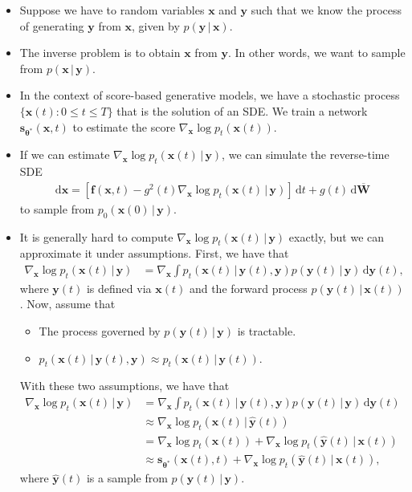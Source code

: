 \documentclass[10pt]{article}
\newcommand{\dee}{\mathrm{d}}
\newcommand{\ve}[1]{\mathbf{#1}}
\newcommand{\ves}[1]{\boldsymbol{#1}}
\begin{document}
\begin{itemize}
  \item Suppose we have to random variables $\ve{x}$ and $\ve{y}$ such that we know the process of generating $\ve{y}$ from $\ve{x}$, given by $p(\ve{y}\,|\, \ve{x})$.
  
  \item The inverse problem is to obtain $\ve{x}$ from $\ve{y}$. In other words, we want to sample from $p(\ve{x}\,|\,\ve{y})$.
  
  \item In the context of score-based generative models, we have a stochastic process $\{\ve{x}(t) : 0 \leq t \leq T\}$ that is the solution of an SDE. We train a network $\ve{s}_{\ves{\theta}^*}(\ve{x}, t)$ to estimate the score $\nabla_{\ve{x}} \log p_t(\ve{x}(t))$. 
  
  \item If we can estimate $\nabla_{\ve{x}} \log p_t(\ve{x}(t)\,|\,\ve{y})$, we can simulate the reverse-time SDE
  \begin{align*}
    \dee\ve{x} = [\ve{f}(\ve{x}, t) - g^2(t) \nabla_\ve{x} \log p_t(\ve{x}(t)\, |\, \ve{y})]\, \dee t + g(t)\, \dee\overline{\ve{W}}
  \end{align*}
  to sample from $p_0(\ve{x}(0)\,|\,\ve{y})$.

  \item It is generally hard to compute $\nabla_\ve{x} \log p_t(\ve{x}(t)\, |\, \ve{y})$ exactly, but we can approximate it under assumptions. First, we have that
  \begin{align*}
    \nabla_\ve{x} \log p_t(\ve{x}(t)\, |\, \ve{y})
    &= \nabla_\ve{x} \int p_t(\ve{x}(t)\,|\, \ve{y}(t), \ve{y}) p(\ve{y}(t)\,|\,\ve{y})\, \dee\ve{y}(t),
  \end{align*}
  where $\ve{y}(t)$ is defined via $\ve{x}(t)$ and the forward process $p(\ve{y}(t)\,|\,\ve{x}(t))$. Now, assume that
  \begin{itemize}
    \item The process governed by $p(\ve{y}(t)\,|\,\ve{y})$ is tractable.
    \item $p_t(\ve{x}(t)\,|\,\ve{y}(t), \ve{y}) \approx p_t(\ve{x}(t)\, |\, \ve{y}(t))$.
  \end{itemize}
  With these two assumptions, we have that
  \begin{align*}
    \nabla_\ve{x} \log p_t(\ve{x}(t)\, |\, \ve{y})
    &= \nabla_\ve{x} \int p_t(\ve{x}(t)\,|\, \ve{y}(t), \ve{y}) p(\ve{y}(t)\,|\,\ve{y})\, \dee\ve{y}(t) \\
    &\approx \nabla_\ve{x} \log p_t(\ve{x}(t)\,|\,\widehat{\ve{y}}(t)) \\
    &= \nabla_\ve{x} \log p_t(\ve{x}(t)) + \nabla_\ve{x} \log p_t(\widehat{\ve{y}}(t)\,|\,\ve{x}(t))\\
    &\approx \ve{s}_{\ves{\theta}^*}(\ve{x}(t), t) + \nabla_\ve{x} \log p_t(\widehat{\ve{y}}(t)\,|\,\ve{x}(t)),
  \end{align*}
  where $\widehat{\ve{y}}(t)$ is a sample from $p(\ve{y}(t)\,|\,\ve{y})$.
\end{itemize}
\end{document}
